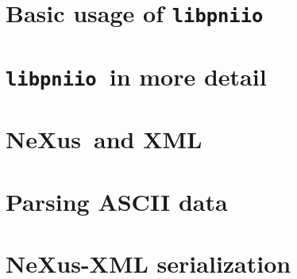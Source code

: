 \documentclass[a4paper,draft]{scrbook}
\newcommand{\libpniio}{\texttt{libpniio}}
\newcommand{\nexus}{NeXus}
\begin{document}
\chapter{Basic usage of \libpniio}

\FloatBarrier


\chapter{\libpniio\ in more detail}

\FloatBarrier

\chapter{\nexus\ and XML}

\FloatBarrier

\appendix
\chapter{Parsing ASCII data}\label{appendix:parsers}

\FloatBarrier

\chapter{\nexus-XML serialization}



%
\end{document}
